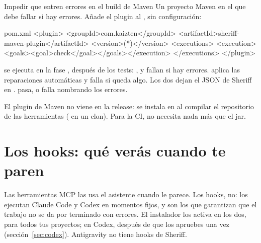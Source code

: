 \documentclass[11pt,a4paper]{article}
\begin{document}
\begin{play}{Impedir que entren errores en el build de Maven}
\when Un proyecto Maven en el que  debe fallar si hay errores.
\asks Añade el plugin al , sin configuración:
\begin{command}[escapeinside={(*}{*)}]{pom.xml}
<plugin>
  <groupId>com.kaizten</groupId>
  <artifactId>sheriff-maven-plugin</artifactId>
  <version>(*\pluginversion*)</version>
  <executions>
    <execution><goals><goal>check</goal></goals></execution>
  </executions>
</plugin>
\end{command}
\happens {} se ejecuta en la fase , después de los
tests: ,  y  fallan si hay
errores.  aplica las reparaciones automáticas y falla si
queda algo. Los dos dejan el JSON de Sheriff en .
\done {} pasa, o falla nombrando los errores.
\end{play}

\begin{note}
El plugin de Maven no viene en la release: se instala en  al
compilar el repositorio de las herramientas ( en un clon).
Para la CI,  no necesita nada más que el jar.
\end{note}

\section{Los hooks: qué verás cuando te paren}
\label{sec:hooks}

Las herramientas MCP las usa el asistente cuando le parece. Los hooks, no: los
ejecutan Claude Code y Codex en momentos fijos, y son los que garantizan que el
trabajo no se da por terminado con errores. El instalador los activa en los dos,
para todos tus proyectos; en Codex, después de que los apruebes una vez
(sección~\ref{sec:codex}). Antigravity no tiene hooks de Sheriff.
\end{document}
